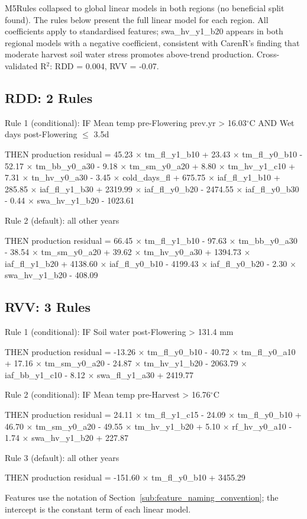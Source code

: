 M5Rules collapsed to global linear models in both regions (no beneficial split found). The rules below present the full linear model for each region. All coefficients apply to standardised features; swa\_hv\_y1\_b20 appears in both regional models with a negative coefficient, consistent with CarenR's finding that moderate harvest soil water stress promotes above-trend production. Cross-validated R$^2$: RDD = 0.004, RVV = -0.07.


\subsection{RDD: 2 Rules}\label{app_sub:rdd_2_rules}

Rule 1 (conditional): IF Mean temp pre-Flowering prev.yr > 16.03$^\circ$C AND Wet days post-Flowering $\leq$ 3.5d

THEN production residual = 45.23 $\times$ tm\_fl\_y1\_b10 + 23.43 $\times$ tm\_fl\_y0\_b10 - 52.17 $\times$ tm\_bb\_y0\_a30 - 9.18 $\times$ tm\_sm\_y0\_a20 + 8.80 $\times$ tm\_hv\_y1\_c10 + 7.31 $\times$ tn\_hv\_y0\_a30 - 3.45 $\times$ cold\_days\_fl + 675.75 $\times$ iaf\_fl\_y1\_b10 + 285.85 $\times$ iaf\_fl\_y1\_b30 + 2319.99 $\times$ iaf\_fl\_y0\_b20 - 2474.55 $\times$ iaf\_fl\_y0\_b30 - 0.44 $\times$ swa\_hv\_y1\_b20 - 1023.61

Rule 2 (default): all other years

THEN production residual = 66.45 $\times$ tm\_fl\_y1\_b10 - 97.63 $\times$ tm\_bb\_y0\_a30 - 38.54 $\times$ tm\_sm\_y0\_a20 + 39.62 $\times$ tm\_hv\_y0\_a30 + 1394.73 $\times$ iaf\_fl\_y1\_b20 + 4138.60 $\times$ iaf\_fl\_y0\_b10 - 4199.43 $\times$ iaf\_fl\_y0\_b20 - 2.30 $\times$ swa\_hv\_y1\_b20 - 408.09


\subsection{RVV: 3 Rules}\label{app_sub:rvv_3_rules}

Rule 1 (conditional): IF Soil water post-Flowering > 131.4 mm

THEN production residual = -13.26 $\times$ tm\_fl\_y0\_b10 - 40.72 $\times$ tm\_fl\_y0\_a10 + 17.16 $\times$ tm\_sm\_y0\_a20 - 24.87 $\times$ tm\_hv\_y1\_b20 - 2063.79 $\times$ iaf\_bb\_y1\_c10 - 8.12 $\times$ swa\_fl\_y1\_a30 + 2419.77

Rule 2 (conditional): IF Mean temp pre-Harvest > 16.76$^\circ$C

THEN production residual = 24.11 $\times$ tm\_fl\_y1\_c15 - 24.09 $\times$ tm\_fl\_y0\_b10 + 46.70 $\times$ tm\_sm\_y0\_a20 - 49.55 $\times$ tm\_hv\_y1\_b20 + 5.10 $\times$ rf\_hv\_y0\_a10 - 1.74 $\times$ swa\_hv\_y1\_b20 + 227.87

Rule 3 (default): all other years

THEN production residual = -151.60 $\times$ tm\_fl\_y0\_b10 + 3455.29

Features use the notation of Section~\ref{sub:feature_naming_convention}; the intercept is the constant term of each linear model.

